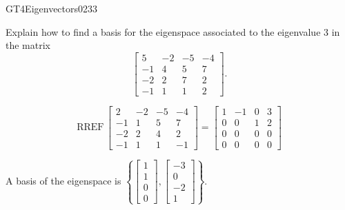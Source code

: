 \begin{exercise}{GT4}{Eigenvectors}{0233} 
\begin{exerciseStatement} 

Explain how to find a basis for the eigenspace associated to the eigenvalue \(3\) in the matrix \[\left[\begin{array}{cccc}
5 & -2 & -5 & -4 \\
-1 & 4 & 5 & 7 \\
-2 & 2 & 7 & 2 \\
-1 & 1 & 1 & 2
\end{array}\right].\]

 \end{exerciseStatement}
 \begin{exerciseAnswer} 

\[\mathrm{RREF}\,\left[\begin{array}{cccc}
2 & -2 & -5 & -4 \\
-1 & 1 & 5 & 7 \\
-2 & 2 & 4 & 2 \\
-1 & 1 & 1 & -1
\end{array}\right]=\left[\begin{array}{cccc}
1 & -1 & 0 & 3 \\
0 & 0 & 1 & 2 \\
0 & 0 & 0 & 0 \\
0 & 0 & 0 & 0
\end{array}\right]\]

 

A basis of the eigenspace is \(\left\{ \left[\begin{array}{c}
1 \\
1 \\
0 \\
0
\end{array}\right] , \left[\begin{array}{c}
-3 \\
0 \\
-2 \\
1
\end{array}\right] \right\}\).

 \end{exerciseAnswer}
 \end{exercise}


